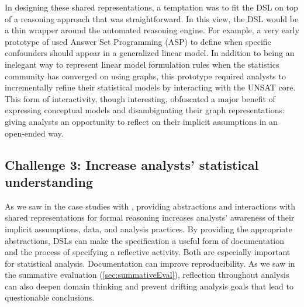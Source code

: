 In designing these shared representations, a temptation was to fit the DSL on
top of a reasoning approach that was straightforward. In this view, the DSL
would be a thin wrapper around the automated reasoning engine. For example, a
very early prototype of \tisane used Answer Set Programming (ASP) to define when
specific confounders should appear in a generalized linear model. In addition to
being an inelegant way to represent linear model formulation rules when the
statistics community has converged on using graphs, this prototype required
analysts to incrementally refine their statistical models by interacting with
the UNSAT core. This form of interactivity, though interesting, obfuscated a
major benefit of expressing conceptual models and disambiguating their graph
representations: giving analysts an opportunity to reflect on their implicit
assumptions in an open-ended way.

\subsection{Challenge 3: Increase analysts' statistical understanding}
As we saw in the case studies with \tisane, providing abstractions and
interactions with shared representations for formal reasoning increases
analysts' awareness of their implicit assumptions, data, and analysis practices.
By providing the appropriate abstractions, DSLs can make the specification a
useful form of documentation and the process of specifying a reflective
activity. Both are especially important for statistical analysis.
Documentation can improve reproducibility. As we saw in the summative
evaluation (\autoref{sec:summativeEval}), reflection throughout analysis can also deepen domain thinking and
prevent drifting analysis goals that lead to questionable conclusions. 

\begin{comment}
\section{Recent developments} \label{sec:recentDevelopments}
Mention: in LLMs impact the contributions of this dissertation, exciting opportunities to leverage them to realize the goals of this work

\subsection{What about in the face of LLMs?}

But how do people express their domain knowledge, make the process meaningful

Mention LLMs as a technology to use here?
\end{comment}

